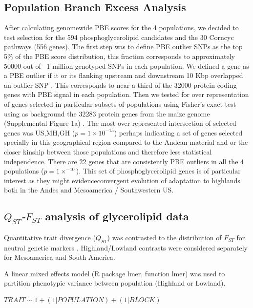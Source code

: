 \documentclass[9pt,twocolumn,twoside,lineno]{gsajnl}
\begin{document}
\subsection{Population Branch Excess Analysis}
After calculating genomewide PBE scores for the 4 populations, we decided to test selection for the 594 phosphoglycerolipid candidates and the 30 Corncyc pathways (556 genes). The first step was to define PBE outlier SNPs as the top 5\% of the PBE score distribution, this fraction corresponds to approximately 50000 out of ~1 million genotyped SNPs in each population. We defined a gene as a PBE outlier if it or its flanking upstream and downstream 10 Kbp overlapped an outlier SNP \cite{Wang2020-mp}. This corresponds to near a third of the  32000 protein coding genes with PBE signal in each population. Then we tested for over representation of genes selected in particular subsets of populations using Fisher's exact test using as background the 32283 protein genes from the maize genome (Supplemental Figure 1a) \cite{wang2015a} .  The most over-represented intersection of selected genes was US,MH,GH ($p = 1  \times 10 ^{-15} $) perhaps indicating a set of genes selected specially in this geographical region compared to the Andean material and or the closer kinship between those populations and therefore less statistical independence. There are 22 genes that are consistently PBE outliers in all the 4 populations ($p = 1  \times  ^{-10}$). This set of phosphoglycerolipid genes is of particular interest as they might evidenceconvergent evolution of adaptation to highlands both in the Andes and Mesoamerica / Southwestern US. 

\subsection{\textit{$Q_{ST}$-$F_{ST}$} analysis of glycerolipid data}

Quantitative trait divergence ($Q_{ST}$) was contrasted to the distribution of $F_{ST}$ for neutral genetic markers \citep{whitlock2008evolutionary}.
Highland/Lowland contrasts were considered separately for Mesoamerica and South America.

A linear mixed effects model (R package lmer, function lmer) was used to partition phenotypic variance between population (Highland or Lowland).

\begin{center}
${ TRAIT \sim 1 + (1|POPULATION) + (1|BLOCK) }$
\end{center}
\end{document}
